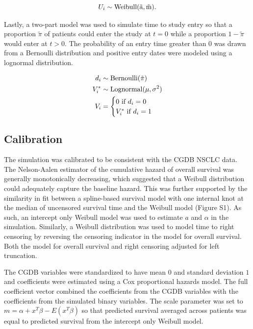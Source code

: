 \documentclass[11pt,final,fleqn]{article}\usepackage[]{graphicx}\usepackage[]{color}
\theoremstyle{plain}
\begin{document}
\begin{equation} 
U_i \sim \rm{Weibull}(\tilde{a}, \tilde{m}).
\end{equation} 

Lastly, a two-part model was used to simulate time to study entry so that a proportion $\tilde{\pi}$ of patients could enter the study at $t=0$ while a proportion $1-\tilde{\pi}$ would enter at $t>0$. The probability of an entry time greater than $0$ was drawn from a Bernoulli distribution and positive entry dates were modeled using a lognormal distribution. 

\begin{align}
d_i &\sim \rm{Bernoulli}(\tilde{\pi}) \\
V_i^{*} &\sim \rm{Lognormal}(\mu, \sigma^2) \\
V_i &=\begin{cases}
 0  \text{ if } d_i = 0\\
  V_i^{*}  \text{ if } d_i = 1
  \end{cases}
\end{align}

\subsection{Calibration} \label{subsec:sim-calibration}
The simulation was calibrated to be consistent with the CGDB NSCLC data. The Nelson-Aalen estimator of the cumulative hazard of overall survival was generally monotonically decreasing, which suggested that a Weibull distribution could adequately capture the baseline hazard. This was further supported by the similarity in fit between a spline-based survival model with one internal knot at the median of uncensored survival time and the Weibull model (Figure S1). As such, an intercept only Weibull model was used to estimate $a$ and $\alpha$ in the simulation. Similarly, a Weibull distribution was used to model time to right censoring by reversing the censoring indicator in the model for overall survival. Both the model for overall survival and right censoring adjusted for left truncation. 

The CGDB variables were standardized to have mean $0$ and standard deviation $1$ and coefficients were estimated using a Cox proportional hazards model. The full coefficient vector combined the coefficients from the CGDB variables with the coefficients from the simulated binary variables. The scale parameter was set to $m = \alpha + x^T\beta - E(x^T\beta)$ so that predicted survival averaged across patients was equal to predicted survival from the intercept only Weibull model. 
\end{document}

